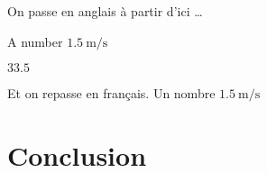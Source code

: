 
On passe en anglais à partir d'ici \ldots


A number $\SI{1.5}{\meter\per\second}$ 




$33.5$

Et on repasse en français. Un nombre $\SI{1.5}{\meter\per\second}$


\section{Conclusion}
\label{sec:Conclu2}
